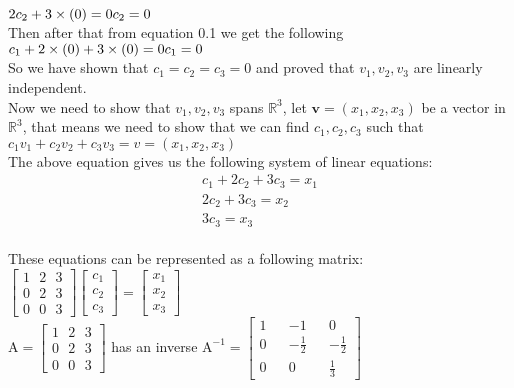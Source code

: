 \documentclass[10pt,a4paper]{article}
\numberwithin{equation}{section}
\begin{document}
$2c_{2}+3 \times (0) = 0 \\ c_{2}=0$ \\
Then after that from equation 0.1 we get the following \\
$c_{1}+2\times (0)+3\times(0) = 0 \\ c_{1}=0$ \\
So we have shown that $c_{1}=c_{2}=c_{3}=0$ and proved that $v_{1},v_{2},v_{3}$ are linearly independent. \\
Now we need to show that $v_{1},v_{2},v_{3}$ spans $\mathbb{R}^3$, let $\mathbf{v}=(x_{1},x_{2},x_{3})$ be a vector in $\mathbb{R}^3$, that means we need to show that we can find $c_{1},c_{2},c_{3}$ such that $c_{1}v_{1}+c_{2}v_{2}+c_{3}v_{3}=v=(x_{1},x_{2},x_{3})$ \\
The above equation gives us the following system of linear equations:\\
\begin{align*}
	c_{1}+2c_{2}+3c_{3}=x_{1} \\
	2c_{2}+3c_{3}=x_{2} \\
	3c_{3}=x_{3}
\end{align*} \\
These equations can be represented as a following matrix: \\
$\begin{bmatrix}
	1 ~~~ 2 ~~~ 3 \\
	0 ~~~ 2 ~~~ 3 \\
	0 ~~~ 0 ~~~ 3
\end{bmatrix} \begin{bmatrix}
c_{1} \\
c_{2} \\
c_{3}
\end{bmatrix}=\begin{bmatrix}
x_{1} \\
x_{2} \\
x_{3}
\end{bmatrix}$ \\
$\text{A}=\begin{bmatrix}
	1 ~~~ 2 ~~~ 3 \\
	0 ~~~ 2 ~~~ 3 \\
	0 ~~~ 0 ~~~ 3
\end{bmatrix}$ has an inverse $\text{A}^{-1}=\begin{bmatrix}
1 &&-1&&0 \\
0 && -\frac{1}{2}&&-\frac{1}{2} \\
0 &&0&&\frac{1}{3}
\end{bmatrix}$ \\
\end{document}
